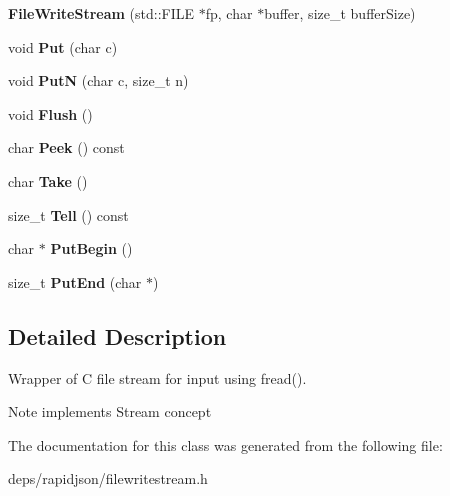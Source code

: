 \begin{DoxyCompactItemize}
\item 
{\bfseries File\+Write\+Stream} (std\+::\+F\+I\+LE $\ast$fp, char $\ast$buffer, size\+\_\+t buffer\+Size)\hypertarget{class_file_write_stream_a553ea3e7377a7f7cace2daa3cc90e1a1}{}\label{class_file_write_stream_a553ea3e7377a7f7cace2daa3cc90e1a1}

\item 
void {\bfseries Put} (char c)\hypertarget{class_file_write_stream_af6a6061d0accd939fa475b9b34427d85}{}\label{class_file_write_stream_af6a6061d0accd939fa475b9b34427d85}

\item 
void {\bfseries PutN} (char c, size\+\_\+t n)\hypertarget{class_file_write_stream_ad9ec108b24316a2c1c83c6ddc75d308a}{}\label{class_file_write_stream_ad9ec108b24316a2c1c83c6ddc75d308a}

\item 
void {\bfseries Flush} ()\hypertarget{class_file_write_stream_a939fbf183ba36464c5e0837df4329d37}{}\label{class_file_write_stream_a939fbf183ba36464c5e0837df4329d37}

\item 
char {\bfseries Peek} () const \hypertarget{class_file_write_stream_a83a8321c33738544f05330f3638e51c0}{}\label{class_file_write_stream_a83a8321c33738544f05330f3638e51c0}

\item 
char {\bfseries Take} ()\hypertarget{class_file_write_stream_ac927a0ae09a85eaba58a74ceb04b40ed}{}\label{class_file_write_stream_ac927a0ae09a85eaba58a74ceb04b40ed}

\item 
size\+\_\+t {\bfseries Tell} () const \hypertarget{class_file_write_stream_a72889b68dbd766cea0e003389b990722}{}\label{class_file_write_stream_a72889b68dbd766cea0e003389b990722}

\item 
char $\ast$ {\bfseries Put\+Begin} ()\hypertarget{class_file_write_stream_a4d1340a64fde3f16ac2afce19537c75e}{}\label{class_file_write_stream_a4d1340a64fde3f16ac2afce19537c75e}

\item 
size\+\_\+t {\bfseries Put\+End} (char $\ast$)\hypertarget{class_file_write_stream_a54b14047e4c998db0594290605f8f0dc}{}\label{class_file_write_stream_a54b14047e4c998db0594290605f8f0dc}

\end{DoxyCompactItemize}


\subsection{Detailed Description}
Wrapper of C file stream for input using fread(). 

\begin{DoxyNote}{Note}
implements Stream concept 
\end{DoxyNote}


The documentation for this class was generated from the following file\+:\begin{DoxyCompactItemize}
\item 
deps/rapidjson/filewritestream.\+h\end{DoxyCompactItemize}
